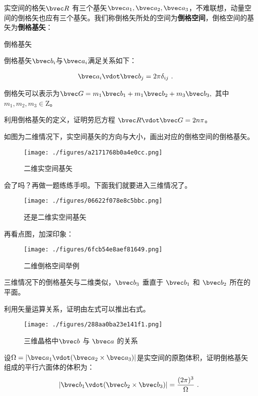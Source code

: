 实空间的格矢$\bvec R$ 有三个基矢$\bvec a_1, \bvec a_2, \bvec a_3$，不难联想，动量空间的倒格矢也应有三个基矢。我们称倒格矢所处的空间为\textbf{倒格空间}，倒格空间的基矢为\textbf{倒格基矢}：
\begin{definition}{倒格基矢}

倒格基矢$\bvec b_i$与$\bvec a_i$满足关系如下：

\begin{align}
\bvec a_i \vdot \bvec b_j  &= 2\pi \delta_{ij}~.
\end{align}


\end{definition}
倒格矢可以表示为$\bvec G = m_1 \bvec b_1 +  m_1 \bvec b_2 + m_3 \bvec b_3,~$其中$ m_1,m_2,m_3 \in \mathrm{Z}$。
\begin{exercise}{}
利用倒格基矢的定义，证明劳厄方程 $\bvec R \vdot \bvec G = 2 n \pi$。
\end{exercise}
\begin{exercise}{}
如图为二维情况下，实空间基矢的方向与大小，画出对应的倒格空间的倒格基矢。
\begin{figure}[ht]
\centering
\texttt{[image: ./figures/a2171768b0a4e0cc.png]}
\caption{二维实空间基矢} \label{fig_RecLat_5}
\end{figure}

\end{exercise}

\begin{exercise}{}
会了吗？再做一题练练手呗。下面我们就要进入三维情况了。
\begin{figure}[ht]
\centering
\texttt{[image: ./figures/06622f078e8c5bbc.png]}
\caption{还是二维实空间基矢} \label{fig_RecLat_6}
\end{figure}
\end{exercise}

再看点图，加深印象：

\begin{figure}[ht]
\centering
\texttt{[image: ./figures/6fcb54e8aef81649.png]}
\caption{二维倒格空间举例} \label{fig_RecLat_8}
\end{figure}

三维情况下的倒格基矢与二维类似，$\bvec b_3$ 垂直于 $\bvec b_1 $ 和 $\bvec b_2 $ 所在的平面。
\begin{exercise}{}
利用矢量运算关系，证明由左式可以推出右式。
\begin{figure}[ht]
\centering
\texttt{[image: ./figures/288aa0ba23e141f1.png]}
\caption{三维晶格中$\bvec b$ 与 $\bvec a$ 的关系} \label{fig_RecLat_7}
\end{figure}

\end{exercise}

\begin{exercise}{}
设$\Omega = |\bvec a_1 \vdot (\bvec a_2 \times \bvec a_3)|$是实空间的原胞体积，证明倒格基矢组成的平行六面体的体积为：
\begin{equation}
|\bvec b_1 \vdot (\bvec b_2 \times \bvec b_3)| = \dfrac{(2\pi)^3}{\Omega}~.
\end{equation}

\end{exercise}

